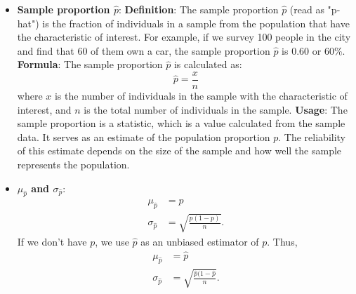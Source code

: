 \documentclass{report}
\begin{document}
\begin{itemize}
        \item \textbf{Sample proportion $\hat{p}$}:
            \textbf{Definition}: The sample proportion $\hat{p}$ (read as "p-hat") is the fraction of individuals in a sample from the population that have the characteristic of interest. For example, if we survey 100 people in the city and find that 60 of them own a car, the sample proportion $\hat{p}$ is 0.60 or 60\%.
            \bigbreak \noindent 
            \textbf{Formula}: The sample proportion $\hat{p}$ is calculated as:
            \[
                \hat{p} = \frac{x}{n}
            \]
            where $x$ is the number of individuals in the sample with the characteristic of interest, and $n$ is the total number of individuals in the sample.
            \bigbreak \noindent 
            \textbf{Usage}: The sample proportion is a statistic, which is a value calculated from the sample data. It serves as an estimate of the population proportion $p$. The reliability of this estimate depends on the size of the sample and how well the sample represents the population.
        \item \textbf{$\mu_{\hat{p}}$ and $\sigma_{\hat{p}}$}:
            \begin{align*}
                \mu_{\hat{p}} &= p \\
                \sigma_{\hat{p}} &= \sqrt{\frac{p(1-p)}{n}}
            .\end{align*}
            If we don't have $p$, we use $\hat{p}$ as an unbiased estimator of $p$. Thus,
            \begin{align*}
                \mu_{\hat{p}} &= \hat{p} \\
                \sigma_{\hat{p}} &= \sqrt{\frac{\hat{p}(1-\hat{p}}{n}}
            .\end{align*}


\end{itemize}
\end{document}
